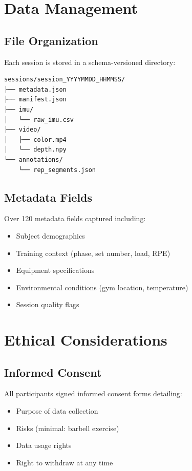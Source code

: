 \section{Data Management}

\subsection{File Organization}

Each session is stored in a schema-versioned directory:

\begin{verbatim}
sessions/session_YYYYMMDD_HHMMSS/
├── metadata.json
├── manifest.json
├── imu/
│   └── raw_imu.csv
├── video/
│   ├── color.mp4
│   └── depth.npy
└── annotations/
    └── rep_segments.json
\end{verbatim}

\subsection{Metadata Fields}

Over 120 metadata fields captured including:
\begin{itemize}
    \item Subject demographics
    \item Training context (phase, set number, load, RPE)
    \item Equipment specifications
    \item Environmental conditions (gym location, temperature)
    \item Session quality flags
\end{itemize}

\section{Ethical Considerations}

\subsection{Informed Consent}

All participants signed informed consent forms detailing:
\begin{itemize}
    \item Purpose of data collection
    \item Risks (minimal: barbell exercise)
    \item Data usage rights
    \item Right to withdraw at any time
\end{itemize}

